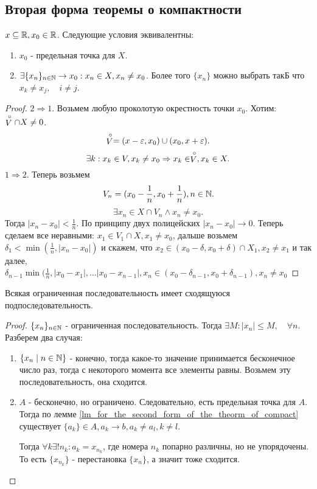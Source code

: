 \documentclass[12pt]{report}
\begin{document}
\subsection{Вторая форма теоремы о компактности}\label{ques_35}
\begin{lm}\label{lm_for_the_second_form_of_the_theorm_of_compact}
    $x \subseteq \mathbb{R}, x_0 \in  \mathbb{R}$. Следующие условия эквивалентны: $ $
    \begin{enumerate}
        \item $x_0$ - предельная точка для $X$.
	\item $\exists \{x_n\}_{n \in \mathbb{N}} \to x_0 : x_n \in  X, x_n \ne x_0$. Более того $\{x_n\}$ можно выбрать такБ что $x_k \ne x_j, \quad i\ne j$.
    \end{enumerate}
\end{lm}
\begin{proof}
    $2 \Rightarrow  1$.
    Возьмем любую проколотую окрестность точки $x_0$. Хотим:  $\stackrel \circ V \cap X \ne 0$.\[
	\stackrel \circ V = (x -\varepsilon , x_0) \cup (x_0, x+ \varepsilon )
    .\] 
     \[
    \exists k : x_k \in  V, x_k \ne x_0 \Rightarrow x_k \in  \stackrel \circ V, x_k \in  X
    .\] 
    $1 \Rightarrow 2$.
    Теперь возьмем 
     \[
	 V_n = (x_0 -\frac{1}{n}, x_0 + \frac{1}{n}), n \in  \mathbb{N}
    .\] 
    \[
	\exists x_n \in  X \cap V_n \wedge x_n \ne x_0
    .\] 
    Тогда $|x_n - x_0| < \frac{1}{n}$. По принципу двух полицейских $|x_n - x_0| \to  0$.
    Теперь сделаем все неравными:
    $x_1 \in  V_1 \cap X, x_1 \ne x_0$, дальше возьмем $\delta_1  < \min (\frac{1}{n} , |x_n - x_0|)$ и скажем, что $x_2 \in  (x_0 - \delta , x_0 + \delta ) \cap X_1, x_2 \ne x_1$ и так далее, $\delta_{n-1} \min (\frac{1}{n}, |x_0 -x_1|, \ldots |x_0 - x_{n-1}|, x_n \in  (x_0 - \delta _{n-1}, x_0 + \delta_{n-1}), x_n \ne x_0 $
\end{proof}
\begin{thm}
    Всякая ограниченная последовательность имеет сходящуюся подпоследовательность.
\end{thm}
\begin{proof}
    $\{x_n\}_{n \in \mathbb{N}}$ - ограниченная последовательность. Тогда $\exists M: |x_n| \le M, \quad \forall n$. Разберем два случая:
    $ $
    \begin{enumerate}
        \item $\{x_n \mid n \in  \mathbb{N}\}$ - конечно, тогда какое-то значение принимается бесконечное число раз, тогда с некоторого момента все элементы равны. Возьмем эту последовательность, она сходится.
	\item $A$ - бесконечно, но ограничено. Следовательно, есть предельная точка для $A$.
	    Тогда по лемме \ref{lm_for_the_second_form_of_the_theorm_of_compact} существует $\{a_k\} \in  A, a_k \to  b,  a_k \ne a_l , k \ne l$.

	    Тогда $\forall k \exists ! n_k: a_k=x_{n_k}$, где номера $n_k$ попарно различны, но не упорядочены. То есть $\{x_{n_k}\}$ - перестановка $\{x_n\}$, а значит тоже сходится.
    \end{enumerate}
\end{proof}
\end{document}
